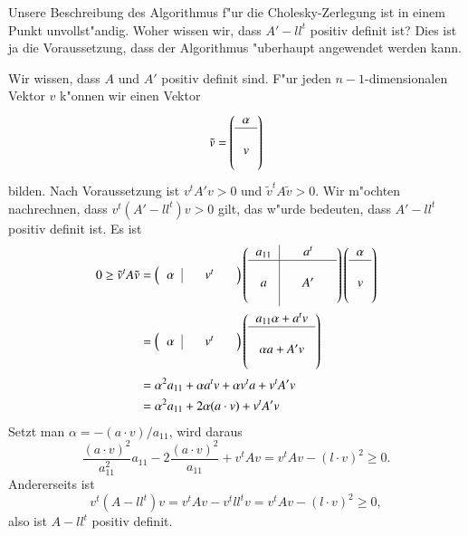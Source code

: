 {\small
Unsere Beschreibung des Algorithmus f"ur die Cholesky-Zerlegung ist in
einem Punkt unvollst"andig.
Woher wissen wir, dass $A'-ll^t$ positiv
definit ist? Dies ist ja die Voraussetzung, dass der Algorithmus
"uberhaupt angewendet werden kann.

Wir wissen, dass $A$ und $A'$ positiv definit sind.
F"ur jeden $n-1$-dimensionalen Vektor $v$ k"onnen wir einen Vektor
\[
\tilde v=\left(
\begin{tabular}{c}
$\alpha$\\
\hline
$\mathstrut$\\
$v$\\
$\mathstrut$
\end{tabular}
\right)
\]
bilden.
Nach Voraussetzung ist $v^tA'v>0$ und $\tilde v^tA\tilde v>0$.
Wir m"ochten nachrechnen, dass $v^t(A'-ll^t)v>0$ gilt, das w"urde bedeuten,
dass $A'-ll^t$ positiv definit ist.
Es ist
\begin{align*}
0\ge
\tilde v^tA\tilde v
&=
\left(
\begin{tabular}{>{$}c<{$}|>{$}c<{$}>{$}c<{$}>{$}c<{$}}
\alpha&&v^t&
\end{tabular}
\right)
\left(
\begin{tabular}{>{$}c<{$}|>{$}c<{$}>{$}c<{$}>{$}c<{$}}
a_{11}&&a^t&\\
\hline
&&&\\
a&&A'&\\
&&&
\end{tabular}
\right)
\left(
\begin{tabular}{>{$}c<{$}}
\alpha\\
\hline
\mathstrut\\
v\\
\mathstrut
\end{tabular}
\right)
\\
&=
\left(
\begin{tabular}{>{$}c<{$}|>{$}c<{$}>{$}c<{$}>{$}c<{$}}
\alpha&&v^t&
\end{tabular}
\right)
\left(
\begin{tabular}{>{$}c<{$}}
a_{11}\alpha+a^tv\\
\hline
\\
\alpha a+A'v\\
\\
\end{tabular}
\right)
\\
&=\alpha^2a_{11}+\alpha a^tv+\alpha v^ta+v^tA'v
\\
&=\alpha^2a_{11}+2\alpha (a\cdot v)+v^tA'v
\end{align*}
Setzt man $\alpha=-(a\cdot v)/a_{11}$, wird daraus
\[
\frac{(a\cdot v)^2}{a_{11}^2}a_{11}-2\frac{(a\cdot v)^2}{a_{11}}+v^tAv
=v^tAv-(l\cdot v)^2\ge 0.
\]
Andererseits ist
\[
v^t(A-ll^t)v=v^tAv-v^tll^tv=v^tAv-(l\cdot v)^2\ge 0,
\]
also ist $A-ll^t$ positiv definit.
}

